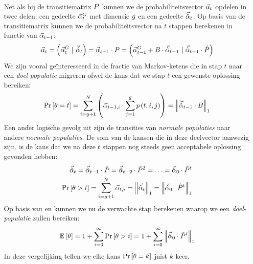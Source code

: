 \paragraph{}
Net als bij de transitiematrix $P$ kunnen we de probabiliteitsvector $\vec{\alpha}_{t}$ opdelen in twee delen: een gedeelte $\vec{\alpha}^G_{t}$ met dimensie $g$ en een gedeelte $\vec{\hat{\alpha}}_{t}$. Op basis van de transitiematrix kunnen we de probabiliteitsvector na $t$ stappen berekenen in functie van $\vec{\alpha}_{t-1}$:
\begin{equation}
\probdistmeta{t}=\brak{\probdistgoalmeta{t}\ |\ \probdistnormmeta{t}}=\probdistmeta{t-1}\cdot\transmat=\brak{\probdistgoalmeta{t-1}+\bridgemat\cdot\probdistnormmeta{t-1}\ |\ \probdistnormmeta{t-1}\cdot\removmat}
\eqnlab{oneStepTransition}
\end{equation}
We zijn vooral ge\"interesseerd in de fractie van Markov-ketens die in stap $t$ naar een \emph{doel-populatie} migreren ofwel de kans dat we stap $t$ een gewenste oplossing bereiken:
\begin{equation}
\Prob{\hittime=t}=\displaystyle\sum_{i=\ntarpop+1}^{N}\brak{\probdistmeta{t-1,i}\cdot\displaystyle\sum_{j=1}^{\ntarpop}\fun{p}{t,i,j}}=\dabs[1]{\probdistnormmeta{t-1}\cdot \bridgemat}
\eqnlab{exhaust}
\end{equation}
Een ander logische gevolg uit  zijn de transities van \emph{normale populaties} naar andere \emph{normale populaties}. De som van de kansen die in deze deelvector aanwezig zijn, is de kans dat we na deze $t$ stappen nog steeds geen acceptabele oplossing gevonden hebben:
\begin{eqnarray}
\probdistnormmeta{t}=\probdistnormmeta{t-1}\cdot\removmat=\probdistnormmeta{t-2}\cdot\removmat^2=\ldots=\probdistnormmeta{0}\cdot\removmat^t\eqnlab{remainder}\\
\Prob{\hittime>t}=\displaystyle\sum_{i=\ntarpop+1}^{\npop}\probdistmeta{t,i}=\dabs[1]{\probdistnormmeta{t}}=\dabs[1]{\probdistnormmeta{0}\cdot\removmat^t}\eqnlab{nothit}
\end{eqnarray}
Op basis van  en  kunnen we nu de verwachte stap berekenen waarop we een \emph{doel-populatie} zullen bereiken:
\begin{equation}
\mean{\hittime}=1+\displaystyle\sum_{i=0}^{\infty}{\Prob{\hittime>i}}=1+\displaystyle\sum_{i=0}^{\infty}{\dabs[1]{\probdistnormmeta{0}\cdot\removmat^i}}
\eqnlab{meanHit}
\end{equation}
In deze vergelijking tellen we elke kans $\Pr\left[\theta=k\right]$ juist $k$ keer.
